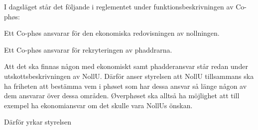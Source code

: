 \documentclass[../_main/handlingar.tex]{subfiles}
\begin{document}

I dagsläget står det följande i reglementet under funktionsbeskrivningen av Co-phøs:

\begin{dashlist}
\item Ett Co-phøs ansvarar för den ekonomiska redovisningen av nollningen. 
\item Ett Co-phøs ansvarar för rekryteringen av phaddrarna.
\end{dashlist}

Att det ska finnas någon med ekonomiskt samt phadderansvar står redan under utskottsbeskrivningen av NollU. Därför anser styrelsen att NollU tillsammans ska ha friheten att bestämma vem i phøset som har dessa ansvar så länge någon av dem ansvarar över dessa områden. Øverphøset ska alltså ha möjlighet att till exempel ha ekonomiansvar om det skulle vara NollUs önskan. 

Därför yrkar styrelsen
\end{document}
